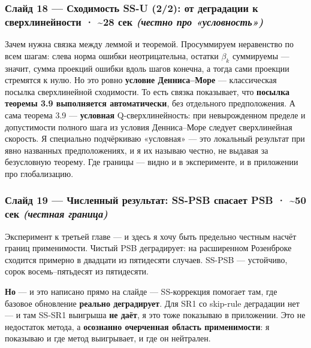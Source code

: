 \documentclass[12pt]{article}
\newenvironment{spoken}{%
  \par\addvspace{0.45em}\begingroup
  \color{spokencol}%
  \setlength{\leftskip}{1.5em}\setlength{\rightskip}{0.2em}%
  \setlength{\parindent}{0pt}%
  \everypar{\llap{{\color{barcol}\vrule width 2pt height 0.9em depth 0.35em}\hspace{0.9em}}}%
}{%
  \par\endgroup\addvspace{0.45em}}
\begin{document}
\subsubsection*{\color{headcol} Слайд 18 — Сходимость SS-U (2/2): от деградации к сверхлинейности  ·  \textasciitilde{}28 сек  \textit{(честно про «условность»)}}
\begin{spoken}
Зачем нужна связка между леммой и теоремой. Просуммируем неравенство по всем шагам: слева норма ошибки неотрицательна, остатки \(\beta _{k}\) суммируемы — значит, сумма проекций ошибки вдоль шагов конечна, а тогда сами проекции стремятся к нулю. Но это ровно \textbf{условие Денниса–Море} — классическая посылка сверхлинейной сходимости. То есть связка показывает, что \textbf{посылка теоремы 3.9 выполняется автоматически}, без отдельного предположения. А сама теорема 3.9 — \textbf{условная} Q-сверхлинейность: при невырожденном пределе и допустимости полного шага из условия Денниса–Море следует сверхлинейная скорость. Я специально подчёркиваю «условная» — это локальный результат при явно названных предположениях, и я их называю честно, не выдавая за безусловную теорему. Где границы — видно и в эксперименте, и в приложении про глобализацию.\par
\end{spoken}

\subsubsection*{\color{headcol} Слайд 19 — Численный результат: SS-PSB спасает PSB  ·  \textasciitilde{}50 сек  \textit{(честная граница)}}
\begin{spoken}
Эксперимент к третьей главе — и здесь я хочу быть предельно честным насчёт границ применимости. Чистый PSB деградирует: на расширенном Розенброке сходится примерно в двадцати из пятидесяти случаев. SS-PSB — устойчиво, сорок восемь–пятьдесят из пятидесяти.\par
\textbf{Но} — и это написано прямо на слайде — SS-коррекция помогает там, где базовое обновление \textbf{реально деградирует}. Для SR1 со skip-rule деградации нет — и там SS-SR1 выигрыша \textbf{не даёт}, я это тоже показываю в приложении. Это не недостаток метода, а \textbf{осознанно очерченная область применимости}: я показываю и где метод выигрывает, и где он нейтрален.\par
\end{spoken}
\end{document}
